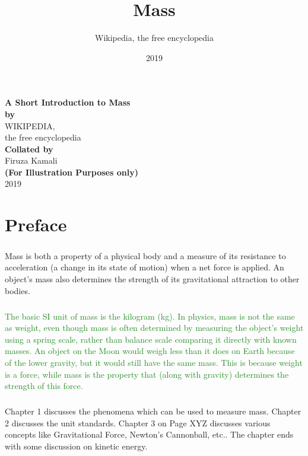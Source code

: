 \documentclass{book}
\title{Mass}
\author{Wikipedia, the free encyclopedia}
\date{2019}
\begin{document}
	\setlength\columnsep{20pt}
	\setlength{\columnseprule}{1pt}
	
	\begin{center}
		\Huge
		\textbf{A Short Introduction to Mass}\\
		\vfill
		\LARGE
		\textbf{by} \\
		WIKIPEDIA, \\ 
		the free encyclopedia \\
		\vfill
		\textbf{Collated by} \\
		\medskip
		Firuza Kamali\\
		\vfill
		\textbf{(For Illustration Purposes only)} \\
		\vfill
		2019 \\
	\end{center}
	
	\chapter*{Preface}
	\LARGE
	\paragraph{}
	\textcolor{WildStrawberry}{Mass is both a property of a physical body and a measure of its resistance to acceleration (a change in its state of motion) when a net force is applied. An object's mass also determines the strength of its gravitational attraction to other bodies.}
	
	\normalsize
	\paragraph{}
	\textcolor{ForestGreen}{The basic SI unit of mass is the kilogram (kg). In physics, mass is not the same as weight, even though mass is often determined by measuring the object's weight using a spring scale, rather than balance scale comparing it directly with known masses. An object on the Moon would weigh less than it does on Earth because of the lower gravity, but it would still have the same mass. This is because weight is a force, while mass is the property that (along with gravity) determines the strength of this force.}
	
	\paragraph{}
	Chapter 1 discusses the phenomena which can be used to measure mass. Chapter 2 discusses the unit standards. Chapter 3 on Page XYZ discusses various concepts like Gravitational Force, Newton's Cannonball, etc.. The chapter ends with some discussion on kinetic energy.
	
\end{document}
